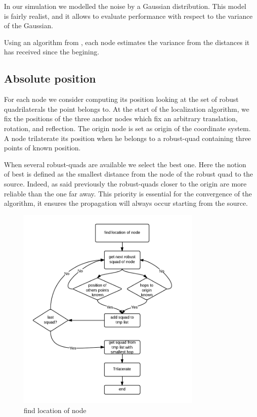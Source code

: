 \documentclass[letterpaper, 10 pt, conference]{ieeeconf}  %
\begin{document}
In our simulation we modelled the noise by a Gaussian distribution.
This model is fairly realist, and it allows to evaluate performance with respect to the variance of the Gaussian.


Using an algorithm from \cite{Knuth} , each node estimates the variance from the distances it has received since the begining.




\subsection{Absolute position}
For each node we consider computing its position looking at the set of robust quadrilaterals the point belongs to. At the start of the localization algorithm, we fix the positions of the three anchor nodes which fix an arbitrary translation, rotation, and reflection. The origin node is set as origin of the coordinate system. A node trilaterate its position when he belongs to a robust-quad containing three points of known position.

When several robust-quads are available we select the best one. Here the notion of best is defined as the smallest distance from the node of the robust quad to the source. Indeed, as said previously the robust-quads closer to the origin are more reliable than the one far away. This priority is essential for the convergence of the algorithm, it ensures the propagation will always occur starting from the source.


\begin{figure}[ht!]
\centering
\includegraphics[width=90mm]{find_location.png}
\caption{find location of node}
\label{overflow}
\end{figure}
\end{document}
